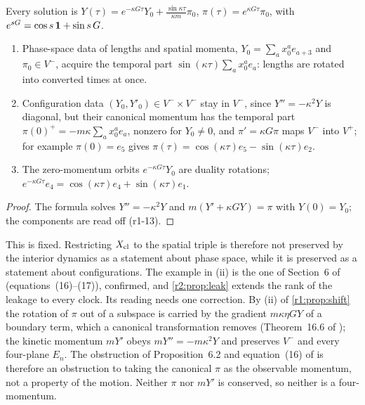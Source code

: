 \begin{proposition}
\label{r1:prop:mix}
Every solution is $Y(\tau)=e^{-\kappa G\tau}Y_0+\frac{\sin\kappa\tau}{\kappa m}\pi_0$, $\pi(\tau)=e^{\kappa G\tau}\pi_0$, with
$e^{sG}=\cos s\,\mathbf 1+\sin s\,G$.
\begin{enumerate}[label=(\roman*),leftmargin=2.2em]
\item Phase-space data of lengths and spatial momenta, $Y_0=\sum_ax_0^ae_{a+3}$ and $\pi_0\in V^-$, acquire the temporal part
$\sin(\kappa\tau)\sum_ax_0^ae_a$: lengths are rotated into converted times at once.
\item Configuration data $(Y_0,Y'_0)\in V^-\times V^-$ stay in $V^-$, since $Y''=-\kappa^2Y$ is diagonal, but their canonical momentum
has the temporal part $\pi(0)^+=-m\kappa\sum_ax^a_0e_a$, nonzero for $Y_0\neq0$, and $\pi'=\kappa G\pi$ maps $V^-$ into $V^+$; for example
$\pi(0)=e_5$ gives
$\pi(\tau)=\cos(\kappa\tau)e_5-\sin(\kappa\tau)e_2$.
\item The zero-momentum orbits $e^{-\kappa G\tau}Y_0$ are duality rotations; $e^{-\kappa G\tau}e_4=\cos(\kappa\tau)e_4+\sin(\kappa\tau)e_1$.
\end{enumerate}
\end{proposition}

\begin{proof}
The formula solves $Y''=-\kappa^2Y$ and $m(Y'+\kappa GY)=\pi$ with $Y(0)=Y_0$; the components are read off (r1-13).
\end{proof}

This is fixed. Restricting $X_{\rm cl}$ to the spatial triple is therefore not preserved by the interior dynamics as a statement about phase
space, while it is preserved as a statement about configurations. The example in (ii) is the one of Section~6 of \cite{FMB}
(equations~(16)--(17)), confirmed, and \cref{r2:prop:leak} extends the rank of the leakage to every clock. Its reading needs one correction. By (ii) of \cref{r1:prop:shift} the rotation of $\pi$ out of a subspace
is carried by the gradient $m\kappa\eta GY$ of a boundary term, which a canonical transformation removes (Theorem~16.6 of \cite{ES17}); the
kinetic momentum $mY'$ obeys $mY''=-m\kappa^2Y$ and preserves $V^-$ and every four-plane $E_n$. The obstruction of Proposition~6.2 and
equation~(16) of \cite{FMB} is therefore an obstruction to taking the canonical $\pi$ as the observable momentum, not a property of the
motion. Neither $\pi$ nor $mY'$ is conserved, so neither is a four-momentum.

